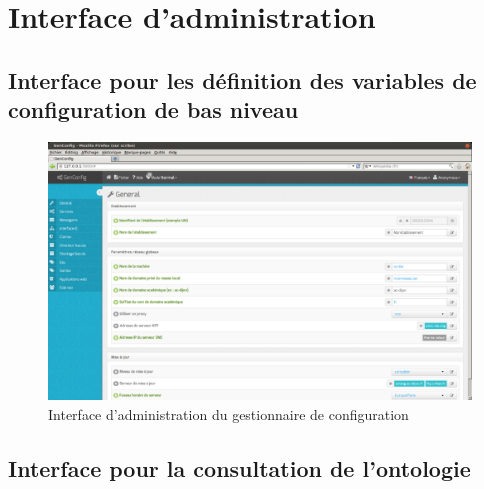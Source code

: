 
\chapter{Interface d'administration}
\label{appendix:interface}

\section{Interface pour les définition des variables de configuration de bas
niveau}
\label{appendix:interface_genconfig}

\begin{figure}[H]
    \centerline{\includegraphics[width=\textwidth]{img/gen_config}}
    \caption{Interface d'administration du gestionnaire de configuration}
    \label{fig:gen_config}
\end{figure}

\section{Interface pour la consultation de l'ontologie}
\label{appendix:interface_query}

